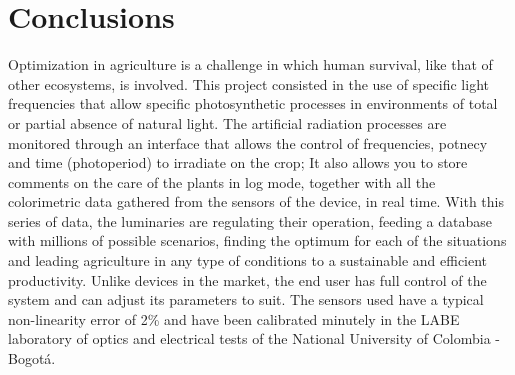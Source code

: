 \documentclass[letterpaper,12pt,twoside]{articleingud}
\begin{document}
\section{Conclusions}
Optimization in agriculture is a challenge in which human survival, like that of other ecosystems, is involved. This project consisted in the use of specific light frequencies that allow specific photosynthetic processes in environments of total or partial absence of natural light. The artificial radiation processes are monitored through an interface that allows the control of frequencies, potnecy and time (photoperiod) to irradiate on the crop; It also allows you to store comments on the care of the plants in log mode, together with all the colorimetric data gathered from the sensors of the device, in real time. With this series of data, the luminaries are regulating their operation, feeding a database with millions of possible scenarios, finding the optimum for each of the situations and leading agriculture in any type of conditions to a sustainable and efficient productivity. Unlike devices in the market, the end user has full control of the system and can adjust its parameters to suit. The sensors used have a typical non-linearity error of 2\% and have been calibrated minutely in the LABE laboratory of optics and electrical tests of the National University of Colombia - Bogotá.
\end{document}
